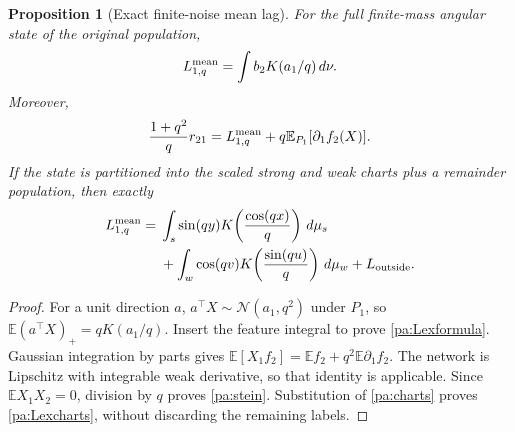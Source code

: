 \documentclass[11pt]{article}
\numberwithin{equation}{section}
\newtheorem{proposition}{Proposition}[section]
\theoremstyle{definition}
\theoremstyle{remark}
\newcommand{\E}{\mathbb E}
\newcommand{\1}{\mathbf 1}
\newcommand{\dd}{\,d}
\begin{document}
\begin{proposition}[Exact finite-noise mean lag]\label{pa:Lex}
For the full finite-mass angular state of the original population,
\begin{equation}\label{pa:Lexformula}
 L_{1,q}^{\rm mean}=\int b_2K(a_1/q)\dd\nu.
\end{equation}
Moreover,
\begin{equation}\label{pa:stein}
 \frac{1+q^2}{q}r_{21}
 =L_{1,q}^{\rm mean}+q\E_{P_1}[\partial_1 f_2(X)].
\end{equation}
If the state is partitioned into the scaled strong and weak charts plus a
remainder population, then exactly
\begin{align}\label{pa:Lexcharts}
 L_{1,q}^{\rm mean}={}&
 \int_s\sin(qy)K\!\left(\frac{\cos(qx)}q\right)\dd\mu_s\nonumber\\
 &+\int_w\cos(qv)K\!\left(\frac{\sin(qu)}q\right)\dd\mu_w
 +L_{\rm outside}.
\end{align}
\end{proposition}
\begin{proof}
For a unit direction $a$, $a^\top X\sim\mathcal N(a_1,q^2)$ under $P_1$,
so $\E(a^\top X)_+=qK(a_1/q)$. Insert the feature integral to prove
\eqref{pa:Lexformula}. Gaussian integration by parts gives
$\E[X_1f_2]=\E f_2+q^2\E\partial_1f_2$. The network is Lipschitz with
integrable weak derivative, so that identity is applicable. Since
$\E X_1X_2=0$, division by $q$ proves \eqref{pa:stein}. Substitution of
\eqref{pa:charts} proves \eqref{pa:Lexcharts}, without discarding the
remaining labels.
\end{proof}
\end{document}
